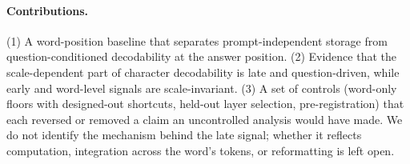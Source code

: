 \paragraph{Contributions.}
(1) A word-position baseline that separates prompt-independent storage from question-conditioned
decodability at the answer position. (2) Evidence that the scale-dependent part of character
decodability is late and question-driven, while early and word-level signals are scale-invariant.
(3) A set of controls (word-only floors with designed-out shortcuts, held-out layer selection,
pre-registration) that each reversed or removed a claim an uncontrolled analysis would have made.
We do not identify the mechanism behind the late signal; whether it reflects computation,
integration across the word's tokens, or reformatting is left open.
